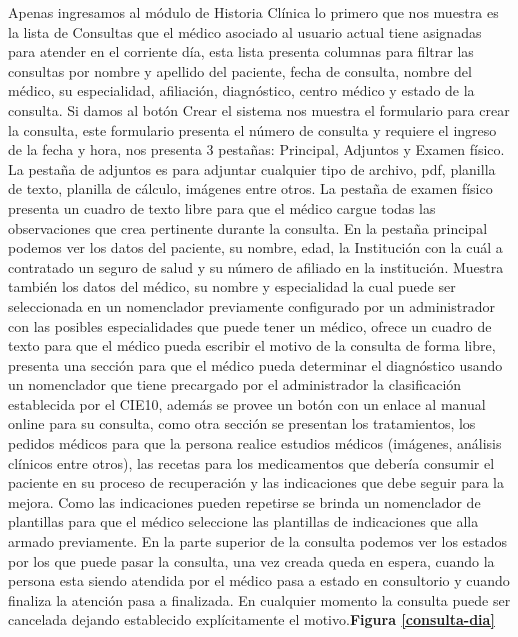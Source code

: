 Apenas ingresamos al módulo de Historia Clínica lo primero que nos muestra es la lista de Consultas que el médico asociado al usuario actual tiene asignadas para atender en el corriente día, esta lista presenta columnas para filtrar las consultas por nombre y apellido del paciente, fecha de consulta, nombre del médico, su especialidad, afiliación, diagnóstico, centro médico y estado de la consulta.
Si damos al botón Crear el sistema nos muestra el formulario para crear la consulta, este formulario presenta el número de consulta y requiere el ingreso de la fecha y hora, nos presenta 3 pestañas: Principal, Adjuntos y Examen físico. 
La pestaña de adjuntos es para adjuntar cualquier tipo de archivo, pdf, planilla de texto, planilla de cálculo, imágenes entre otros.
La pestaña de examen físico presenta un cuadro de texto libre para que el médico cargue todas las observaciones que crea pertinente durante la consulta.
En la pestaña principal podemos ver los datos del paciente, su nombre, edad, la Institución con la cuál a contratado un seguro de salud y su número de afiliado en la institución. Muestra también los datos del médico, su nombre y especialidad la cual puede ser seleccionada en un nomenclador previamente configurado por un administrador con las posibles especialidades que puede tener un médico, ofrece un cuadro de texto para que el médico pueda escribir el motivo de la consulta de forma libre, presenta una sección para que el médico pueda determinar el diagnóstico usando un nomenclador que tiene precargado por el administrador la clasificación establecida por el CIE10, además se provee un botón con un enlace al manual online para su consulta, como otra sección se presentan los tratamientos, los pedidos médicos para que la persona realice estudios médicos (imágenes, análisis clínicos entre otros), las recetas para los medicamentos que debería consumir el paciente en su proceso de recuperación y las indicaciones que debe seguir para la mejora. Como las indicaciones pueden repetirse se brinda un nomenclador de plantillas para que el médico seleccione las plantillas de indicaciones que alla armado previamente. En la parte superior de la consulta podemos ver los estados por los que puede pasar la consulta, una vez creada queda en espera, cuando la persona esta siendo atendida por el médico pasa a estado en consultorio y cuando finaliza la atención pasa a finalizada. En cualquier momento la consulta puede ser cancelada dejando establecido explícitamente el motivo.\textbf{Figura \ref{consulta-dia}}

